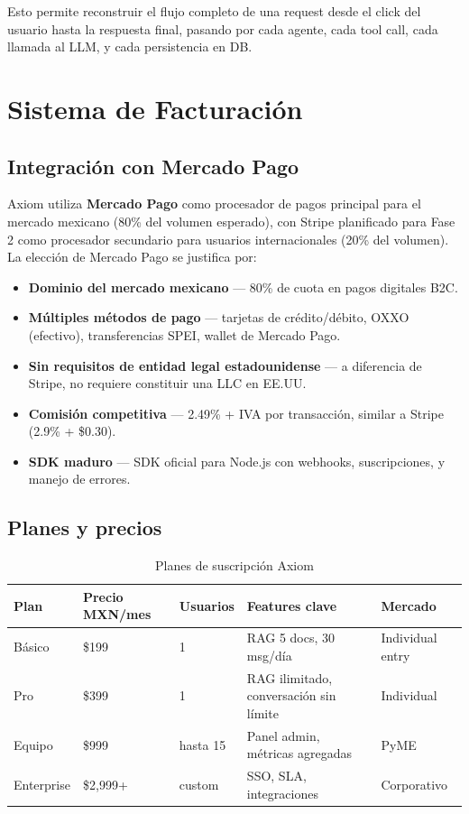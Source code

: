 \documentclass[10pt,a4paper,oneside]{report}
\begin{document}
Esto permite reconstruir el flujo completo de una request desde el click del usuario hasta la respuesta final, pasando por cada agente, cada tool call, cada llamada al LLM, y cada persistencia en DB.

\chapter{Sistema de Facturación}

\section{Integración con Mercado Pago}
Axiom utiliza \textbf{Mercado Pago} como procesador de pagos principal para el mercado mexicano (80\% del volumen esperado), con Stripe planificado para Fase 2 como procesador secundario para usuarios internacionales (20\% del volumen). La elección de Mercado Pago se justifica por:

\begin{itemize}[leftmargin=1.4em]
\item \textbf{Dominio del mercado mexicano} — 80\% de cuota en pagos digitales B2C.
\item \textbf{Múltiples métodos de pago} — tarjetas de crédito/débito, OXXO (efectivo), transferencias SPEI, wallet de Mercado Pago.
\item \textbf{Sin requisitos de entidad legal estadounidense} — a diferencia de Stripe, no requiere constituir una LLC en EE.UU.
\item \textbf{Comisión competitiva} — 2.49\% + IVA por transacción, similar a Stripe (2.9\% + \$0.30).
\item \textbf{SDK maduro} — SDK oficial para Node.js con webhooks, suscripciones, y manejo de errores.
\end{itemize}

\section{Planes y precios}

\begin{table}[H]
\centering
\begin{tabular}{p{2cm}p{2.2cm}p{3cm}p{4cm}p{2cm}}
\toprule
\textbf{Plan} & \textbf{Precio MXN/mes} & \textbf{Usuarios} & \textbf{Features clave} & \textbf{Mercado} \\
\midrule
Básico & \$199 & 1 & RAG 5 docs, 30 msg/día & Individual entry \\
Pro & \$399 & 1 & RAG ilimitado, conversación sin límite & Individual \\
Equipo & \$999 & hasta 15 & Panel admin, métricas agregadas & PyME \\
Enterprise & \$2,999+ & custom & SSO, SLA, integraciones & Corporativo \\
\bottomrule
\end{tabular}
\caption{Planes de suscripción Axiom}
\end{table}
\end{document}
